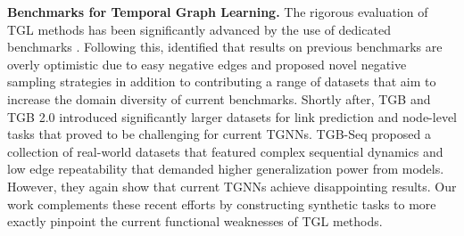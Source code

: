 



 \textbf{Benchmarks for Temporal Graph Learning.} The rigorous evaluation of TGL methods has been significantly advanced by the use of dedicated benchmarks \citep{Jodie_Kumar_2019, uci, enron, social-evo}. Following this, \cite{poursafaei2022betterevaluationdynamiclink} identified that results on previous benchmarks are overly optimistic due to easy negative edges and proposed novel negative sampling strategies in addition to contributing a range of datasets that aim to increase the domain diversity of current benchmarks. Shortly after, TGB \citep{tgb} and TGB 2.0 \citep{tgb2.0} introduced significantly larger datasets for link prediction and node-level tasks that proved to be challenging for current TGNNs. TGB-Seq \citep{tgb-seq} proposed a collection of real-world datasets that featured complex sequential dynamics and low edge repeatability that demanded higher generalization power from models. However, they again show that current TGNNs achieve disappointing results. Our work complements these recent efforts by constructing synthetic tasks to more exactly pinpoint the current functional weaknesses of TGL methods.


